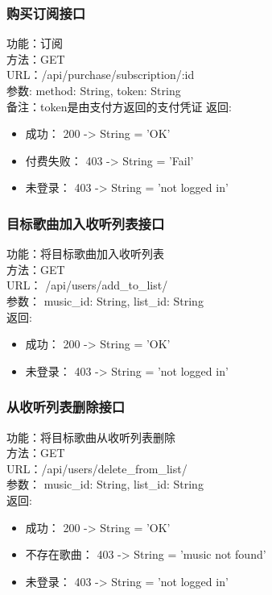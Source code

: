 \subsubsection{购买订阅接口}

\noindent
功能：订阅\\
方法：GET\\
URL：/api/purchase/subscription/:id\\
参数: method: String, token: String\\
备注：token是由支付方返回的支付凭证
返回:
\begin{itemize}
	\item 成功： 200 -> String = 'OK'
	\item 付费失败： 403 -> String = 'Fail'
	\item 未登录： 403 -> String = 'not logged in'
\end{itemize}

\subsubsection{目标歌曲加入收听列表接口}

\noindent
功能：将目标歌曲加入收听列表\\
方法：GET\\
URL： /api/users/add\_to\_list/\\
参数： music\_id: String, list\_id: String\\
返回:
\begin{itemize}
	\item 成功： 200 -> String = 'OK'
	\item 未登录： 403 -> String = 'not logged in'
\end{itemize}


\subsubsection{从收听列表删除接口}

\noindent
功能：将目标歌曲从收听列表删除\\
方法：GET\\
URL：/api/users/delete\_from\_list/\\
参数： music\_id: String, list\_id: String\\
返回:
\begin{itemize}
	\item 成功： 200 -> String = 'OK'
	\item 不存在歌曲： 403 -> String = 'music not found'
	\item 未登录： 403 -> String = 'not logged in'
\end{itemize}


